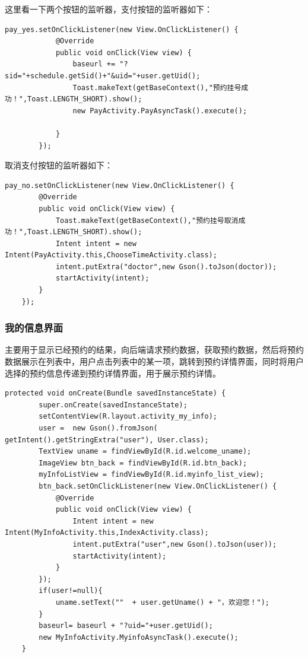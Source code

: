 \documentclass[UTF8,12pt]{article}
\begin{document}
这里看一下两个按钮的监听器，支付按钮的监听器如下：

\begin{lstlisting}[frame=shadowbox]
    pay_yes.setOnClickListener(new View.OnClickListener() {
            @Override
            public void onClick(View view) {
                baseurl += "?sid="+schedule.getSid()+"&uid="+user.getUid();
                Toast.makeText(getBaseContext(),"预约挂号成功！",Toast.LENGTH_SHORT).show();
                new PayActivity.PayAsyncTask().execute();

            }
        });
\end{lstlisting}

取消支付按钮的监听器如下：

\begin{lstlisting}[frame=shadowbox]
    pay_no.setOnClickListener(new View.OnClickListener() {
        @Override
        public void onClick(View view) {
            Toast.makeText(getBaseContext(),"预约挂号取消成功！",Toast.LENGTH_SHORT).show();
            Intent intent = new Intent(PayActivity.this,ChooseTimeActivity.class);
            intent.putExtra("doctor",new Gson().toJson(doctor));
            startActivity(intent);
        }
    });
\end{lstlisting}

\newpage

\subsubsection{我的信息界面}
主要用于显示已经预约的结果，向后端请求预约数据，获取预约数据，然后将预约数据展示在列表中，用户点击列表中的某一项，跳转到预约详情界面，同时将用户选择的预约信息传递到预约详情界面，用于展示预约详情。

\begin{lstlisting}[frame=shadowbox]
    protected void onCreate(Bundle savedInstanceState) {
        super.onCreate(savedInstanceState);
        setContentView(R.layout.activity_my_info);
        user =  new Gson().fromJson( getIntent().getStringExtra("user"), User.class);
        TextView uname = findViewById(R.id.welcome_uname);
        ImageView btn_back = findViewById(R.id.btn_back);
        myInfoListView = findViewById(R.id.myinfo_list_view);
        btn_back.setOnClickListener(new View.OnClickListener() {
            @Override
            public void onClick(View view) {
                Intent intent = new Intent(MyInfoActivity.this,IndexActivity.class);
                intent.putExtra("user",new Gson().toJson(user));
                startActivity(intent);
            }
        });
        if(user!=null){
            uname.setText(""  + user.getUname() + "，欢迎您！");
        }
        baseurl= baseurl + "?uid="+user.getUid();
        new MyInfoActivity.MyinfoAsyncTask().execute();
    }
\end{lstlisting}
\end{document}
